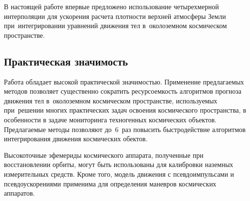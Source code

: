 В настоящей работе впервые предложено использование четырехмерной интерполяции для
ускорения расчета плотности верхней атмосферы Земли 
при интегрировании уравнений движения тел в околоземном космическом пространстве.

\subsection*{Практическая значимость}

Работа обладает высокой практической значимостью. 
Применение предлагаемых методов позволяет существенно сократить ресурсоемкость алгоритмов 
прогноза движения тел в околоземном космическом пространстве, используемых при решении 
многих практических задач освоения космического пространства, в особенности в задаче 
мониторинга техногенных космических объектов. Предлагаемые методы позволяют до 6 раз 
повысить быстродействие алгоритмов интегрирования движения космических обектов.

Высокоточные эфемериды космического аппарата, полученные при восстановлении орбиты,
могут быть использованы для калибровки наземных измерительных средств. 
Кроме того, модель движения с псевдоимпульсами и псевдоускорениями применима 
для определения маневров космических аппаратов.

\newpage
